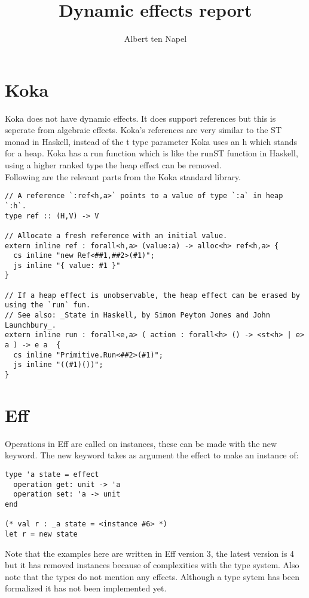 \documentclass[12pt]{article}
\title{Dynamic effects report}
\author{Albert ten Napel}
\date{}
\begin{document}
\maketitle

\section{Koka}
Koka does not have dynamic effects. It does support references but this is seperate from algebraic effects.
Koka's references are very similar to the ST monad in Haskell, instead of the t type parameter Koka uses an h which stands for a heap.
Koka has a run function which is like the runST function in Haskell, using a higher ranked type the heap effect can be removed. \\
Following are the relevant parts from the Koka standard library.
\begin{lstlisting}
// A reference `:ref<h,a>` points to a value of type `:a` in heap `:h`.
type ref :: (H,V) -> V

// Allocate a fresh reference with an initial value.
extern inline ref : forall<h,a> (value:a) -> alloc<h> ref<h,a> { 
  cs inline "new Ref<##1,##2>(#1)";
  js inline "{ value: #1 }"
}

// If a heap effect is unobservable, the heap effect can be erased by using the `run` fun.
// See also: _State in Haskell, by Simon Peyton Jones and John Launchbury_.
extern inline run : forall<e,a> ( action : forall<h> () -> <st<h> | e> a ) -> e a  { 
  cs inline "Primitive.Run<##2>(#1)";
  js inline "((#1)())";
}
\end{lstlisting}

\newpage
\section{Eff}
Operations in Eff are called on instances, these can be made with the new keyword. The new keyword takes as argument the effect to make an instance of:
\begin{lstlisting}
type 'a state = effect
  operation get: unit -> 'a
  operation set: 'a -> unit
end

(* val r : _a state = <instance #6> *)
let r = new state
\end{lstlisting}
Note that the examples here are written in Eff version 3, the latest version is 4 but it has removed instances because of complexities with the type system.
Also note that the types do not mention any effects. Although a type sytem has been formalized\cite{eff2} it has not been implemented yet.
\end{document}
